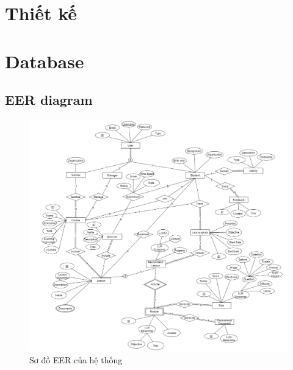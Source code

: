 \section{Thiết kế}

\newpage
\section{Database}
\subsection{EER diagram}
\begin{figure}[h!]
    \centering
    \includegraphics[width=\linewidth]{Images/Anh/EER.png}
    \caption{Sơ đồ EER của hệ thống}
    \label{fig:enter-label}
\end{figure}
